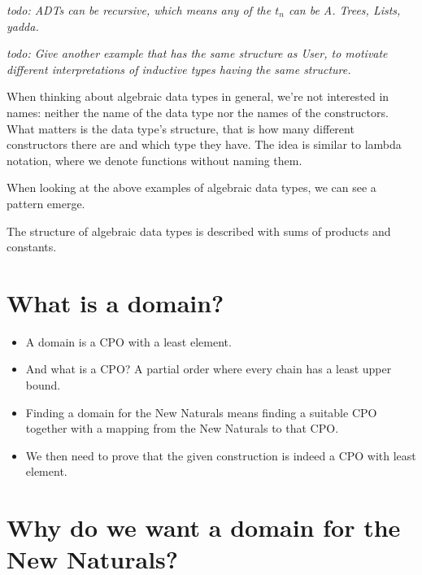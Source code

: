 \documentclass[a4paper]{article}
\newcommand{\todo}[1]{\bigskip \noindent \emph{todo: #1}}
\begin{document}
\todo{ADTs can be recursive, which means any of the $t_n$ can be A. Trees,
Lists, yadda.}

\todo{Give another example that has the same structure as User, to motivate
different interpretations of inductive types having the same structure.}

When thinking about algebraic data types in general, we're not interested in
names: neither the name of the data type nor the names of the constructors.
What matters is the data type's structure, that is how many different
constructors there are and which type they have.  The idea is similar to lambda
notation, where we denote functions without naming them.

When looking at the above examples of algebraic data types, we can see a
pattern emerge.

The structure of algebraic data types is described with sums of products and
constants.

\section{What is a domain?}

\begin{itemize}
\item A domain is a CPO with a least element.
\item And what is a CPO?  A partial order where every chain has a least upper bound.

\item Finding a domain for the New Naturals means finding a suitable CPO
together with a mapping from the New Naturals to that CPO.

\item We then need to prove that the given construction is indeed a CPO with
least element.

\end{itemize}

\section{Why do we want a domain for the New Naturals?}
\end{document}
